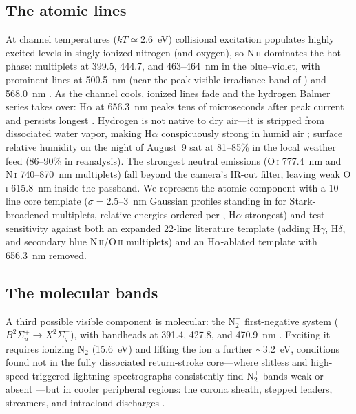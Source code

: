 \documentclass[11pt,a4paper]{article}
\newcommand{\Ntp}{N$_2^+$}
\begin{document}
\subsection{The atomic lines}
At channel temperatures ($kT \simeq 2.6$~eV) collisional excitation populates
highly excited levels in singly ionized nitrogen (and oxygen), so
N\,\textsc{ii} dominates the hot phase: multiplets at 399.5, 444.7, and
463--464~nm in the blue--violet, with prominent lines at 500.5~nm (near the
peak visible irradiance band of \cite{orvillehenderson1984}) and 568.0~nm
\citep{salanave1961,wallace1964,orville1968}. As the channel cools, ionized
lines fade and the hydrogen Balmer series takes over: H$\alpha$ at 656.3~nm
peaks tens of microseconds after peak current and persists longest
\citep{orville1968}. Hydrogen is not native to dry air---it is stripped from
dissociated water vapor, making H$\alpha$ conspicuously strong in humid air
\citep{orville1968,rakovuman2003}; surface relative humidity on the night of
August~9 sat at 81--85\% in the local weather feed (86--90\% in reanalysis).
The strongest neutral emissions (O\,\textsc{i} 777.4~nm and N\,\textsc{i}
740--870~nm multiplets) fall beyond the camera's IR-cut filter, leaving weak
O\,\textsc{i} 615.8~nm inside the passband. We represent the atomic component
with a 10-line core template ($\sigma=2.5$--3~nm Gaussian profiles standing in
for Stark-broadened multiplets, relative energies ordered per
\cite{orville1968,orvillehenderson1984}, H$\alpha$ strongest) and test
sensitivity against both an expanded 22-line literature template (adding
H$\gamma$, H$\delta$, and secondary blue N\,\textsc{ii}/O\,\textsc{ii}
multiplets) and an H$\alpha$-ablated template with 656.3~nm removed.

\subsection{The molecular bands}
\label{sec:molecular}
A third possible visible component is molecular: the \Ntp{} first-negative
system ($B^2\Sigma_u^+ \to X^2\Sigma_g^+$), with bandheads at 391.4, 427.8,
and 470.9~nm \citep{salanave1962,wallace1964,orville1968}. Exciting it
requires ionizing N$_2$ (15.6~eV) and lifting the ion a further $\sim$3.2~eV,
conditions found not in the fully dissociated return-stroke core---where
slitless and high-speed triggered-lightning spectrographs consistently find
\Ntp{} bands weak or absent \citep{salanave1962,walker2017,walker2019}---but
in cooler peripheral regions: the corona sheath, stepped leaders, streamers,
and intracloud discharges \citep{wallace1964,orville1968,rakovuman2003}.
\end{document}
